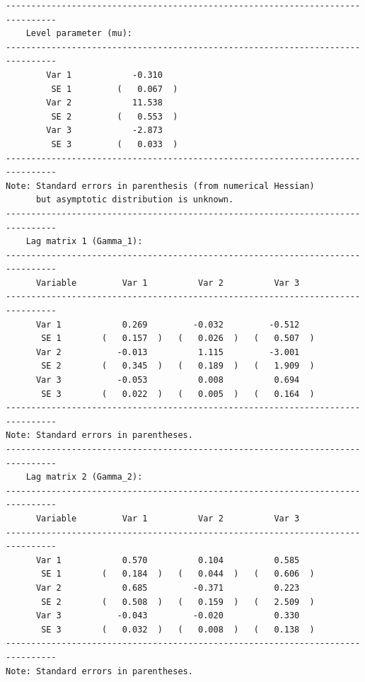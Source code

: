 \documentclass[article]{jss}
\begin{document}
\begin{verbatim}
--------------------------------------------------------------------------------
    Level parameter (mu):                                                                         
--------------------------------------------------------------------------------
        Var 1            -0.310     
         SE 1         (   0.067  )  
        Var 2            11.538     
         SE 2         (   0.553  )  
        Var 3            -2.873     
         SE 3         (   0.033  )  
--------------------------------------------------------------------------------
Note: Standard errors in parenthesis (from numerical Hessian) 
      but asymptotic distribution is unknown. 
--------------------------------------------------------------------------------
    Lag matrix 1 (Gamma_1):                                                                            
--------------------------------------------------------------------------------
      Variable         Var 1          Var 2          Var 3   
--------------------------------------------------------------------------------
      Var 1            0.269         -0.032         -0.512    
       SE 1        (   0.157  )   (   0.026  )   (   0.507  )  
      Var 2           -0.013          1.115         -3.001    
       SE 2        (   0.345  )   (   0.189  )   (   1.909  )  
      Var 3           -0.053          0.008          0.694    
       SE 3        (   0.022  )   (   0.005  )   (   0.164  )  
--------------------------------------------------------------------------------
Note: Standard errors in parentheses.                                                                
--------------------------------------------------------------------------------
    Lag matrix 2 (Gamma_2):                                                                            
--------------------------------------------------------------------------------
      Variable         Var 1          Var 2          Var 3   
--------------------------------------------------------------------------------
      Var 1            0.570          0.104          0.585    
       SE 1        (   0.184  )   (   0.044  )   (   0.606  )  
      Var 2            0.685         -0.371          0.223    
       SE 2        (   0.508  )   (   0.159  )   (   2.509  )  
      Var 3           -0.043         -0.020          0.330    
       SE 3        (   0.032  )   (   0.008  )   (   0.138  )  
--------------------------------------------------------------------------------
Note: Standard errors in parentheses.                                                                

\end{verbatim}
\end{document}
